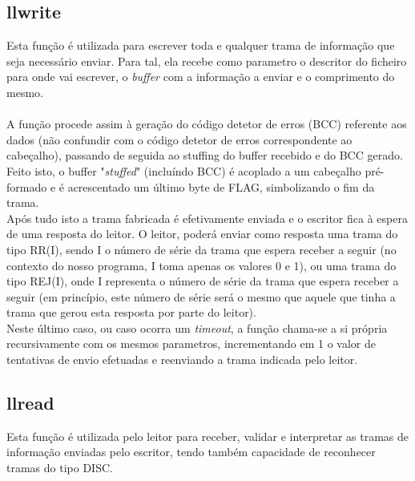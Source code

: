 \documentclass{article}
\begin{document}
\subsection{llwrite}
Esta função é utilizada para escrever toda e qualquer trama de informação que seja necessário enviar. Para tal, ela recebe como parametro o descritor do ficheiro para onde vai escrever, o \textit{buffer} com a informação a enviar e o comprimento do mesmo.\\\\

A função procede assim à geração do código detetor de erros (BCC) referente aos dados (não confundir com o código detetor de erros correspondente ao cabeçalho), passando de seguida ao stuffing do buffer recebido e do BCC gerado.\\
Feito isto, o buffer "\textit{stuffed}" (incluíndo BCC) é acoplado a um cabeçalho pré-formado e é acrescentado um último byte de FLAG, simbolizando o fim da trama.\\
Após tudo isto a trama fabricada é efetivamente enviada e o escritor fica à espera de uma resposta do leitor. O leitor, poderá enviar como resposta uma trama do tipo RR(I), sendo I o número de série da trama que espera receber a seguir (no contexto do nosso programa, I toma apenas os valores 0 e 1), ou uma trama do tipo REJ(I), onde I representa o número de série da trama que espera receber a seguir (em princípio, este número de série será o mesmo que aquele que tinha a trama que gerou esta resposta por parte do leitor). %
\\Neste último caso, ou caso ocorra um \textit{timeout}, a função chama-se a si própria recursivamente com os mesmos parametros, incrementando em 1 o valor de tentativas de envio efetuadas e reenviando a trama indicada pelo leitor.

\subsection{llread}
Esta função é utilizada pelo leitor para receber, validar e interpretar as tramas de informação enviadas pelo escritor, tendo também capacidade de reconhecer tramas do tipo DISC.\\
\end{document}
